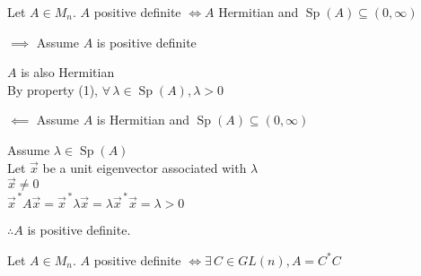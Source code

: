 \documentclass[letterpaper,12pt,fleqn]{article}
\newcommand{\vx}{\vec{x}}
\newcommand{\vxct}{\vx^{\,*}}
\renewcommand{\l}{\lambda}
\DeclareMathOperator{\Sp}{Sp}
\begin{document}
\begin{theorem}
  Let $A\in M_n$. $A$ positive definite $\iff A$ Hermitian and
  $\Sp(A)\subseteq(0,\infty)$
\end{theorem}

\begin{theproof}
  \listbreak
  \begin{description}
  \item $\implies$ Assume $A$ is positive definite

    $A$ is also Hermitian \\
    By property (1), $\forall\,\l\in\Sp(A),\l>0$

  \item $\impliedby$ Assume $A$ is Hermitian and $\Sp(A)\subseteq(0,\infty)$

    Assume $\l\in\Sp(A)$ \\
    Let $\vx$ be a unit eigenvector associated with $\l$ \\
    $\vx\ne 0$ \\
    $\vxct A\vx=\vxct\l\vx=\l\vxct\vx=\l>0$

    $\therefore A$ is positive definite.
  \end{description}
\end{theproof}

\begin{theorem}
  Let $A\in M_n$. $A$ positive definite $\iff \exists\,C\in GL(n),A=C^*C$
\end{theorem}
\end{document}
